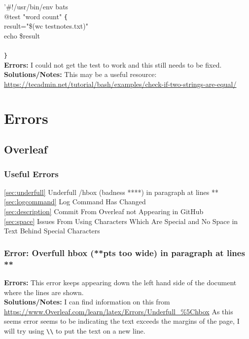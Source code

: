 \documentclass{article}
\begin{document}
\begin{FlushLeft}
'\#!/usr/bin/env bats\\
@test "word count" \verb|{|\\
result="\$(wc test\textunderscore notes.txt)"\\
echo \$result\\
[ "\$result" \verb|==| "17 test\textunderscore notes.txt" ]\\
\verb|}|\\
\textbf{Errors:} I could not get the test to work and this still needs to be fixed.\\
\textbf{Solutions/Notes:} This may be a useful resource: \url{https://tecadmin.net/tutorial/bash/examples/check-if-two-strings-are-equal/}\\

\pagebreak

\section{Errors}
\subsection{Overleaf}

\subsubsection{Useful Errors}
\autoref{sec:underfull} Underfull /hbox (badness ****) in paragraph at lines **\\
\autoref{sec:logcommand} Log Command Has Changed\\
\autoref{sec:description} Commit From Overleaf not Appearing in GitHub\\
\autoref{sec:space} Issues From Using Characters Which Are Special and No Space in Text Behind Special Characters

\subsubsection{Error: Overfull hbox (**pts too wide) in paragraph at lines **}
\textbf{Errors:} This error keeps appearing down the left hand side of the document where the lines are shown.\\
\textbf{Solutions/Notes:} I can find information on this from \url{https://www.Overleaf.com/learn/latex/Errors/Underfull_%5Chbox}
As this seems error seems to be indicating the text exceeds the margins of the page, I will try using \verb|\\| to put the text on a new line. 


\end{FlushLeft}
\end{document}
